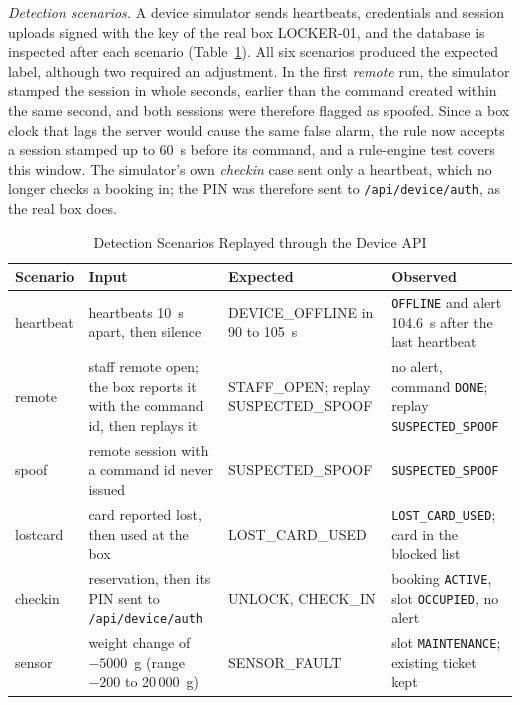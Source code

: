 \textit{Detection scenarios.} A device simulator sends heartbeats, credentials and session uploads signed with the key
of the real box LOCKER-01, and the database is inspected after each scenario (Table~\ref{tab:scen}). All six scenarios
produced the expected label, although two required an adjustment. In the first \emph{remote} run, the simulator
stamped the session in whole seconds, earlier than the command created within the same second, and both sessions were
therefore flagged as spoofed. Since a box clock that lags the server would cause the same false alarm, the rule now
accepts a session stamped up to 60~s before its command, and a rule-engine test covers this window. The simulator's
own \emph{checkin} case sent only a heartbeat, which no longer checks a booking in; the PIN was therefore sent to
\texttt{/api/device/auth}, as the real box does.

\begin{table}[!htbp]
\renewcommand{\arraystretch}{0.85}
\centering
\small
\caption{Detection Scenarios Replayed through the Device API}
\label{tab:scen}
\footnotesize
\begin{tabular}{l >{\raggedright\arraybackslash}p{5.5cm} >{\raggedright\arraybackslash}p{4.2cm} >{\raggedright\arraybackslash}p{6.8cm}}
\hline
Scenario & Input & Expected & Observed \\
\hline
heartbeat & 6 heartbeats 10~s apart, then silence & DEVICE\_OFFLINE in 90 to 105~s & \texttt{OFFLINE} and alert 104.6~s after the last heartbeat \\
remote    & staff remote open; the box reports it with the command id, then replays it & STAFF\_OPEN; replay SUSPECTED\_SPOOF & no alert, command \texttt{DONE}; replay \texttt{SUSPECTED\_SPOOF} \\
spoof     & remote session with a command id never issued & SUSPECTED\_SPOOF & \texttt{SUSPECTED\_SPOOF} \\
lostcard  & card reported lost, then used at the box & LOST\_CARD\_USED & \texttt{LOST\_CARD\_USED}; card in the blocked list \\
checkin   & reservation, then its PIN sent to \texttt{/api/device/auth} & UNLOCK, CHECK\_IN & booking \texttt{ACTIVE}, slot \texttt{OCCUPIED}, no alert \\
sensor    & weight change of $-5000$~g (range $-200$ to 20\,000~g) & SENSOR\_FAULT & slot \texttt{MAINTENANCE}; existing ticket kept \\
\hline
\end{tabular}
\end{table}

